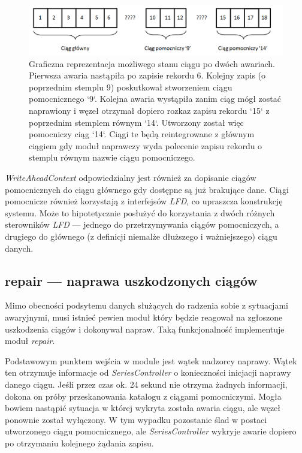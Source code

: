 \documentclass[a4paper,polish,12pt,twoside]{article}
\begin{document}
	\begin{figure}[h]
		\centering \includegraphics[width=16cm]{repair_lossage_1}
		\caption[Graficzna reprezentacja możliwego stanu ciągu po dwóch awariach]{Graficzna reprezentacja możliwego stanu ciągu po dwóch awariach. Pierwsza awaria nastąpiła po zapisie rekordu 6. Kolejny zapis (o poprzednim stemplu 9) poskutkował stworzeniem ciągu pomocnicznego `9`. Kolejna awaria wystąpiła zanim ciąg mógł zostać naprawiony i węzeł otrzymał dopiero rozkaz zapisu rekordu `15` z poprzednim stemplem równym `14`. Utworzony został więc pomocniczy ciąg `14`. Ciągi te będą reintegrowane z głównym ciągiem gdy moduł naprawczy wyda polecenie zapisu rekordu o stemplu równym nazwie ciągu pomocniczego.}
		\label{fig:repair_lossage_1}
	\end{figure}

\textit{WriteAheadContext} odpowiedzialny jest również za dopisanie ciągów pomocnicznych do ciągu głównego gdy dostępne są już brakujące dane. Ciągi pomocnicze również korzystają z interfejsów \textit{LFD}, co upraszcza konstrukcję systemu. Może to hipotetycznie posłużyć do korzystania z dwóch różnych sterowników \textit{LFD} --- jednego do przetrzymywania ciągów pomocniczych, a drugiego do głównego (z definicji niemalże dłuższego i ważniejszego) ciągu danych.

	\subsection{repair --- naprawa uszkodzonych ciągów}
Mimo obecności podsytemu danych służących do radzenia sobie z sytuacjami awaryjnymi, musi istnieć pewien moduł który będzie reagował na zgłoszone uszkodzenia ciągów i dokonywał napraw. Taką funkcjonalność implementuje moduł \textit{repair}.
	
Podstawowym punktem wejścia w module jest wątek nadzorcy naprawy. Wątek ten otrzymuje informacje od \textit{SeriesController} o konieczności inicjacji naprawy danego ciągu. Jeśli przez czas ok. 24 sekund nie otrzyma żadnych informacji, dokona on próby przeskanowania katalogu z ciągami pomocniczymi. Mogła bowiem nastąpić sytuacja w której wykryta została awaria ciągu, ale węzeł ponownie został wyłączony. W tym wypadku pozostanie ślad w postaci utworzonego ciągu pomocnicznego, ale \textit{SeriesController} wykryje awarie dopiero po otrzymaniu kolejnego żądania zapisu.
\end{document}
